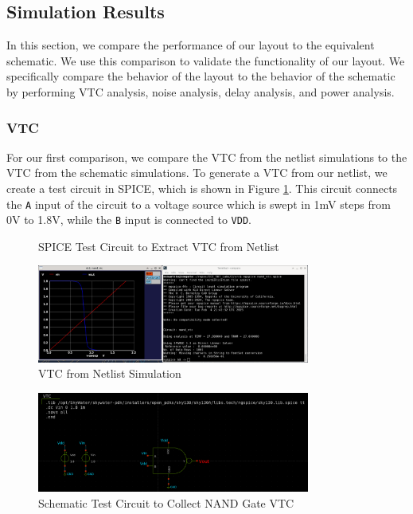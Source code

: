 \documentclass{article}
\begin{document}
	\subsection{Simulation Results}
	
	In this section, we compare the performance of our layout to the equivalent schematic. We use this comparison to validate the functionality of our layout. We specifically compare the behavior of the layout to the behavior of the schematic by performing VTC analysis, noise analysis, delay analysis, and power analysis.
	
	\subsubsection{VTC}
	
	For our first comparison, we compare the VTC from the netlist simulations to the VTC from the schematic simulations. To generate a VTC from our netlist, we create a test circuit in SPICE, which is shown in Figure \ref{fig::nand_vtc_test_circuit}. This circuit connects the \texttt{A} input of the circuit to a voltage source which is swept in 1mV steps from 0V to 1.8V, while the \texttt{B} input is connected to \texttt{VDD}.
	
	\begin{figure}[H]
		
		\caption{SPICE Test Circuit to Extract VTC from Netlist}
		\label{fig::nand_vtc_test_circuit}
	\end{figure}
	
	\begin{figure}[H]
		\centerline{\includegraphics[width=0.8\textwidth]{nand_vtc.png}}
		\caption{VTC from Netlist Simulation}
		\label{fig::nand_vtc}
	\end{figure}
	
	\begin{figure}[H]
		\centerline{\includegraphics[width=0.8\textwidth]{nand_vtc_test_circuit.png}}
		\caption{Schematic Test Circuit to Collect NAND Gate VTC}
		\label{fig::nand_vtc_schem_test_circuit}
	\end{figure}
	
\end{document}

